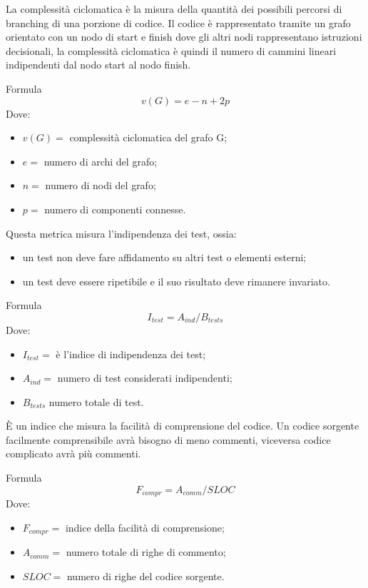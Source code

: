 La complessità ciclomatica è la misura della quantità dei possibili percorsi di 
branching di una porzione di codice. Il codice è rappresentato tramite un 
grafo orientato con un nodo di start e finish dove gli altri nodi rappresentano 
istruzioni decisionali, la complessità ciclomatica è quindi il numero di 
cammini lineari indipendenti dal nodo start al nodo finish.
\par{Formula}
\begin{displaymath}
  v(G) = e - n + 2p
\end{displaymath}
Dove:
\begin{itemize}
  \item[] $v(G) =$ complessità ciclomatica del grafo G;
  \item[] $e =$ numero di archi del grafo;
  \item[] $n =$ numero di nodi del grafo;
  \item[] $p =$ numero di componenti connesse.
\end{itemize}

Questa metrica misura l'indipendenza dei test, ossia:
\begin{itemize}
  \item un test non deve fare affidamento su altri test o elementi esterni;
  \item un test deve essere ripetibile e il suo risultato deve rimanere 
invariato.
\end{itemize}
\par{Formula}
\begin{displaymath}
  I_{test} = A_{ind}/B_{tests}
\end{displaymath}
Dove:
\begin{itemize}
  \item[] $I_{test} =$ è l'indice di indipendenza dei test;
  \item[] $A_{ind} =$ numero di test considerati indipendenti;
  \item[] $B_{tests}$ numero totale di test.
\end{itemize}

È un indice che misura la facilità di comprensione del codice. Un codice 
sorgente facilmente comprensibile avrà bisogno di meno commenti, viceversa 
codice complicato avrà più commenti.
\par{Formula}
\begin{displaymath}
  F_{compr} = A_{comm}/SLOC
\end{displaymath}
Dove:
\begin{itemize}
  \item[] $F_{compr} =$ indice della facilità di comprensione;
  \item[] $A_{comm} =$ numero totale di righe di commento;
  \item[] $SLOC =$ numero di righe del codice sorgente.
\end{itemize}

